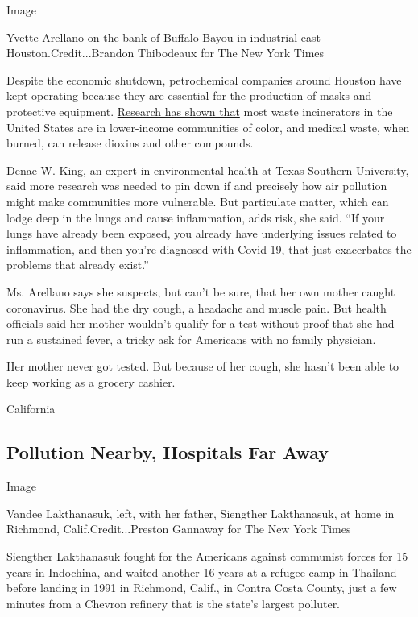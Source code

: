 Image

Yvette Arellano on the bank of Buffalo Bayou in industrial east
Houston.Credit...Brandon Thibodeaux for The New York Times

Despite the economic shutdown, petrochemical companies around Houston
have kept operating because they are essential for the production of
masks and protective equipment.
\href{https://www.newschool.edu/pressroom/pressreleases/2019/incinerators.htm}{Research
has shown that} most waste incinerators in the United States are in
lower-income communities of color, and medical waste, when burned, can
release dioxins and other compounds.

Denae W. King, an expert in environmental health at Texas Southern
University, said more research was needed to pin down if and precisely
how air pollution might make communities more vulnerable. But
particulate matter, which can lodge deep in the lungs and cause
inflammation, adds risk, she said. ``If your lungs have already been
exposed, you already have underlying issues related to inflammation, and
then you're diagnosed with Covid-19, that just exacerbates the problems
that already exist.''

Ms. Arellano says she suspects, but can't be sure, that her own mother
caught coronavirus. She had the dry cough, a headache and muscle pain.
But health officials said her mother wouldn't qualify for a test without
proof that she had run a sustained fever, a tricky ask for Americans
with no family physician.

Her mother never got tested. But because of her cough, she hasn't been
able to keep working as a grocery cashier.

California

\hypertarget{pollution-nearby-hospitals-far-away}{%
\subsection{Pollution Nearby, Hospitals Far
Away}\label{pollution-nearby-hospitals-far-away}}

Image

Vandee Lakthanasuk, left, with her father, Siengther Lakthanasuk, at
home in Richmond, Calif.Credit...Preston Gannaway for The New York Times

Siengther Lakthanasuk fought for the Americans against communist forces
for 15 years in Indochina, and waited another 16 years at a refugee camp
in Thailand before landing in 1991 in Richmond, Calif., in Contra Costa
County, just a few minutes from a Chevron refinery that is the state's
largest polluter.

